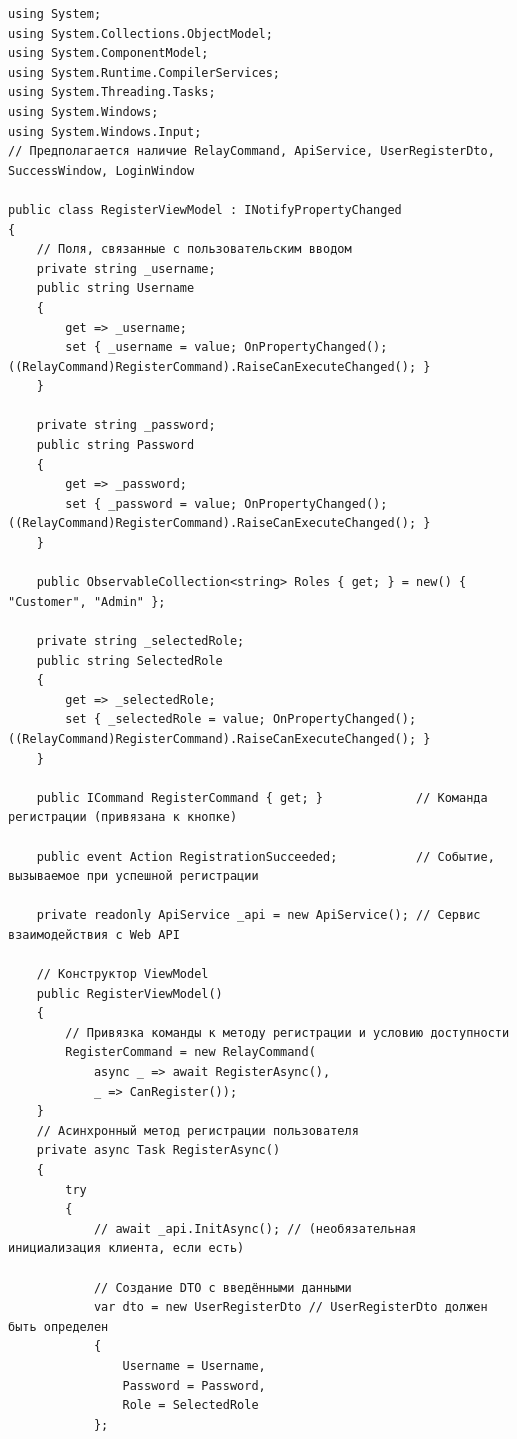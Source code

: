 \documentclass[12pt]{article}
\newenvironment{code}
  {\par\captionsetup{type=listing}\noindent}
  {\par\vspace{\baselineskip}}
\numberwithin{listing}{section}
\numberwithin{figure}{section}
\begin{document}
\begin{code}
	\begin{verbatim}
using System;
using System.Collections.ObjectModel;
using System.ComponentModel;
using System.Runtime.CompilerServices;
using System.Threading.Tasks;
using System.Windows;
using System.Windows.Input;
// Предполагается наличие RelayCommand, ApiService, UserRegisterDto, SuccessWindow, LoginWindow

public class RegisterViewModel : INotifyPropertyChanged
{
    // Поля, связанные с пользовательским вводом
    private string _username;
    public string Username
    {
        get => _username;
        set { _username = value; OnPropertyChanged(); ((RelayCommand)RegisterCommand).RaiseCanExecuteChanged(); }
    }

    private string _password;
    public string Password
    {
        get => _password;
        set { _password = value; OnPropertyChanged(); ((RelayCommand)RegisterCommand).RaiseCanExecuteChanged(); }
    }

    public ObservableCollection<string> Roles { get; } = new() { "Customer", "Admin" };

    private string _selectedRole;
    public string SelectedRole
    {
        get => _selectedRole;
        set { _selectedRole = value; OnPropertyChanged(); ((RelayCommand)RegisterCommand).RaiseCanExecuteChanged(); }
    }

    public ICommand RegisterCommand { get; }             // Команда регистрации (привязана к кнопке)

    public event Action RegistrationSucceeded;           // Событие, вызываемое при успешной регистрации

    private readonly ApiService _api = new ApiService(); // Сервис взаимодействия с Web API

    // Конструктор ViewModel
    public RegisterViewModel()
    {
        // Привязка команды к методу регистрации и условию доступности
        RegisterCommand = new RelayCommand(
            async _ => await RegisterAsync(),
            _ => CanRegister());
    }
    // Асинхронный метод регистрации пользователя
    private async Task RegisterAsync()
    {
        try
        {
            // await _api.InitAsync(); // (необязательная инициализация клиента, если есть)

            // Создание DTO с введёнными данными
            var dto = new UserRegisterDto // UserRegisterDto должен быть определен
            {
                Username = Username,
                Password = Password,
                Role = SelectedRole
            };


\end{verbatim}
\end{code}
\end{document}
